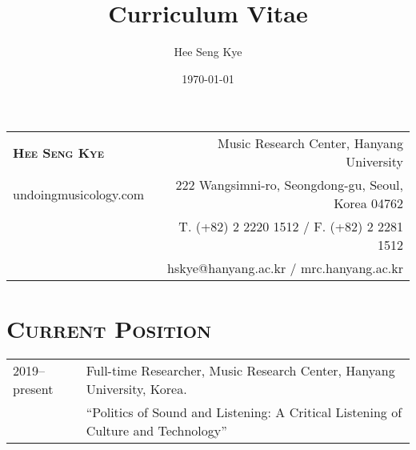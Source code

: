 \documentclass[a4paper,11pt]{article}
\title{Curriculum Vitae}
\author{Hee Seng Kye}
\date{\today}
\begin{document}
  \renewcommand{\headrulewidth}{0pt}
  \fancyhf{}
 
  \fancyfoot[RE,RO]{\small \thepage}
  
  \raggedright \parindent=15pt
  
%  
%  
  
  \hspace*{-0.8cm}
  \begin{tabular}{p{7.26cm} r}
    {\LARGE \textsc{\textbf{Hee Seng Kye}}} & Music Research Center, Hanyang University\\
    undoingmusicology.com & 222 Wangsimni-ro, Seongdong-gu, Seoul, Korea 04762\\
    & T. (+82) 2 2220 1512 / F. (+82) 2 2281 1512\\
    & hskye@hanyang.ac.kr / mrc.hanyang.ac.kr
  \end{tabular}
  
  \vspace{5mm}
  
  \section*{\textsc{Current Position}}
  
  \hspace*{-0.25cm}
  \begin{tabular}{p{2.5cm} l}
    2019--present & Full-time Researcher, Music Research Center, Hanyang University, Korea.\\
    & ``Politics of Sound and Listening: A Critical Listening of Culture and Technology''
  \end{tabular}
  
  \vspace*{2.5mm}
  
\end{document}
